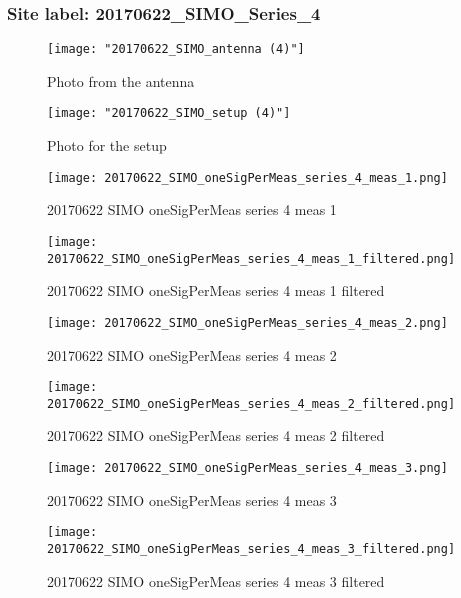 \subsubsection{Site label: 20170622\_SIMO\_Series\_4}
\begin{figure}[ht] \caption{Photo from the antenna}
\texttt{[image: "20170622\_SIMO\_antenna (4)"]}\centering\end{figure}
\begin{figure}[ht] \caption{Photo for the setup}
\texttt{[image: "20170622\_SIMO\_setup (4)"]}\centering\end{figure}
\begin{figure}[ht] \caption{20170622 SIMO oneSigPerMeas series 4 meas 1}
\texttt{[image: 20170622\_SIMO\_oneSigPerMeas\_series\_4\_meas\_1.png]}\centering\end{figure}
\begin{figure}[ht] \caption{20170622 SIMO oneSigPerMeas series 4 meas 1 filtered}
\texttt{[image: 20170622\_SIMO\_oneSigPerMeas\_series\_4\_meas\_1\_filtered.png]}\centering\end{figure}
\begin{figure}[ht] \caption{20170622 SIMO oneSigPerMeas series 4 meas 2}
\texttt{[image: 20170622\_SIMO\_oneSigPerMeas\_series\_4\_meas\_2.png]}\centering\end{figure}
\begin{figure}[ht] \caption{20170622 SIMO oneSigPerMeas series 4 meas 2 filtered}
\texttt{[image: 20170622\_SIMO\_oneSigPerMeas\_series\_4\_meas\_2\_filtered.png]}\centering\end{figure}
\begin{figure}[ht] \caption{20170622 SIMO oneSigPerMeas series 4 meas 3}
\texttt{[image: 20170622\_SIMO\_oneSigPerMeas\_series\_4\_meas\_3.png]}\centering\end{figure}
\begin{figure}[ht] \caption{20170622 SIMO oneSigPerMeas series 4 meas 3 filtered}
\texttt{[image: 20170622\_SIMO\_oneSigPerMeas\_series\_4\_meas\_3\_filtered.png]}\centering\end{figure}
\clearpage
